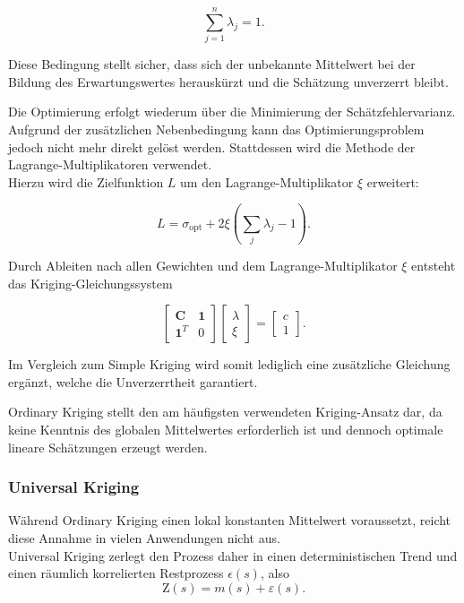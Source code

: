 \begin{equation}
\sum_{j=1}^{n}\lambda_j = 1.
\end{equation}

Diese Bedingung stellt sicher, dass sich der unbekannte 
Mittelwert bei der Bildung des Erwartungswertes herauskürzt 
und die Schätzung unverzerrt bleibt.

Die Optimierung erfolgt wiederum über die Minimierung der
Schätzfehlervarianz. Aufgrund der zusätzlichen Nebenbedingung 
 kann das Optimierungsproblem jedoch nicht mehr direkt gelöst 
werden. Stattdessen wird die Methode der Lagrange-Multiplikatoren
verwendet.\\
Hierzu wird die Zielfunktion $L$ um den Lagrange-Multiplikator 
$\xi$ erweitert:

\begin{equation}
L = \sigma_{\mathrm{opt}} + 2\xi \left( \sum_j\lambda_j - 1 \right).
\end{equation}

Durch Ableiten nach allen Gewichten und dem Lagrange-Multiplikator 
$\xi$ entsteht das Kriging-Gleichungssystem

\begin{equation}
\begin{bmatrix}
\mathbf{C} & \mathbf{1}\\
\mathbf{1}^T & 0
\end{bmatrix}
\begin{bmatrix}
\lambda\\
\xi
\end{bmatrix}
=
\begin{bmatrix}
c\\
1
\end{bmatrix}.
\end{equation}

Im Vergleich zum Simple Kriging wird somit lediglich eine zusätzliche Gleichung 
ergänzt, welche die Unverzerrtheit garantiert.

Ordinary Kriging stellt den am häufigsten verwendeten Kriging-Ansatz dar, da 
keine Kenntnis des globalen Mittelwertes erforderlich ist und dennoch 
optimale lineare Schätz\-un\-gen erzeugt werden.

\subsubsection{Universal Kriging}
Während Ordinary Kriging einen lokal konstanten Mittelwert voraussetzt, reicht 
diese Annahme in vielen Anwendungen nicht aus.\\ 
Universal Kriging zerlegt den Prozess daher in einen 
deterministischen Trend und einen räumlich korrelierten Restprozess 
$\epsilon(s)$,
also
\begin{equation}
\mathrm{Z}(s) = m(s) + \varepsilon(s).
\end{equation}

